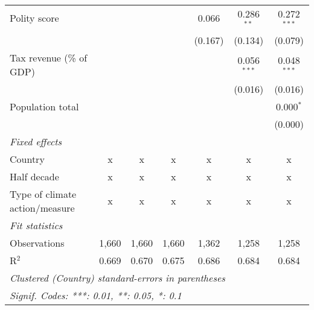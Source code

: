 \begin{tabular}{lcccccc}
   Polity score                                                    &         &         &                & 0.066          & 0.286$^{**}$   & 0.272$^{***}$\\   
                                                                   &         &         &                & (0.167)        & (0.134)        & (0.079)\\   
   Tax revenue (\% of GDP)                                         &         &         &                &                & 0.056$^{***}$  & 0.048$^{***}$\\   
                                                                   &         &         &                &                & (0.016)        & (0.016)\\   
   Population total                                                &         &         &                &                &                & 0.000$^{*}$\\   
                                                                   &         &         &                &                &                & (0.000)\\   
   \emph{Fixed effects}\\
   Country                                                         & x       & x       & x              & x              & x              & x\\  
   Half decade                                                     & x       & x       & x              & x              & x              & x\\  
   Type of climate action/measure                                  & x       & x       & x              & x              & x              & x\\  
   \midrule \emph{Fit statistics}\\
   Observations                                                    & 1,660   & 1,660   & 1,660          & 1,362          & 1,258          & 1,258\\  
   R$^2$                                                           & 0.669   & 0.670   & 0.675          & 0.686          & 0.684          & 0.684\\  
   \midrule
   \multicolumn{7}{l}{\emph{Clustered (Country) standard-errors in parentheses}}\\
   \multicolumn{7}{l}{\emph{Signif. Codes: ***: 0.01, **: 0.05, *: 0.1}}\\
\end{tabular}
\par\endgroup


